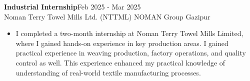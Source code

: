 
\vspace{2mm}
 \textbf{Industrial Internship}\hfill Feb 2025 - Mar 2025\\
 \vspace{1mm}
 Noman Terry Towel Mills Ltd. (NTTML) \textbar{} NOMAN Group \hfill Gazipur\\
\begin{itemize}
\item  
\vspace{-2mm}
\begin{justify}I completed a two-month internship at Noman Terry Towel Mills Limited, where I gained hands-on experience in key production areas. I gained practical experience in weaving production, factory operations, and quality control as well. This experience enhanced my practical knowledge of understanding of real-world textile manufacturing processes.
\end{justify}
\end{itemize}
\vspace{5mm}